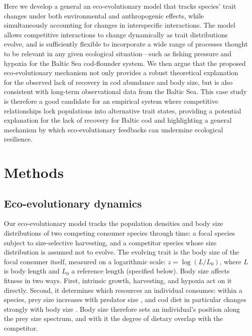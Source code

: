 \documentclass[12pt]{article}
\begin{document}
Here we develop a general an eco-evolutionary model that tracks species' trait changes under both environmental and anthropogenic effects, while simultaneously accounting for changes in interspecific interactions. The model allows competitive interactions to change dynamically as trait distributions evolve, and is sufficiently flexible to incorporate a wide range of processes thought to be relevant in any given ecological situation---such as fishing pressure and hypoxia for the Baltic Sea cod-flounder system. We then argue that the proposed eco-evolutionary mechanism not only provides a robust theoretical explanation for the observed lack of recovery in cod abundance and body size, but is also consistent with long-term observational data from the Baltic Sea. This case study is therefore a good candidate for an empirical system where competitive relationships lock populations into alternative trait states, providing a potential explanation for the lack of recovery for Baltic cod and highlighting a general mechanism by which eco-evolutionary feedbacks can undermine ecological resilience.



\section*{Methods}

\subsection*{Eco-evolutionary dynamics}

Our eco-evolutionary model tracks the population densities and body size distributions of two competing consumer species through time: a focal species subject to size-selective harvesting, and a competitor species whose size distribution is assumed not to evolve. The evolving trait is the body size of the focal consumer itself, measured on a logarithmic scale: $z = \log(L/L_0)$, where $L$ is body length and $L_0$ a reference length (specified below). Body size affects fitness in two ways. First, intrinsic growth, harvesting, and hypoxia act on it directly. Second, it determines which resources an individual consumes: within a species, prey size increases with predator size \citep{Rossberg2013, Schneideretal2016}, and cod diet in particular changes strongly with body size \citep{Kulatska2019, Haase2020, Neuenfeldt2020}. Body size therefore sets an individual's position along the prey size spectrum, and with it the degree of dietary overlap with the competitor.
\end{document}
